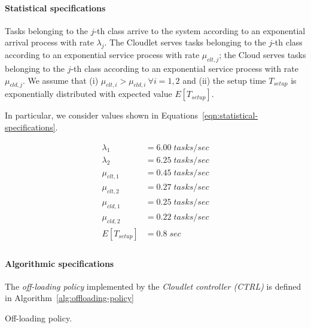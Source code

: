 \paragraph{Statistical specifications}
Tasks belonging to the $j$-th class arrive to the system according to an exponential arrival process with rate $ \lambda_{j}$.
The Cloudlet serves tasks belonging to the $j$-th class according to an exponential service process with rate $\mu_{clt,j}$; the Cloud serves tasks belonging to the $j$-th class according to an exponential service process with rate $\mu_{cld,j}$.
We assume that 
(i) $\mu_{clt,i}>\mu_{cld,i}\ \forall i=1,2$ and
(ii) the setup time $T_{setup}$ is exponentially distributed with expected value $E[T_{setup}]$.

In particular, we consider values shown in Equations~\ref{eqn:statistical-specifications}.

\begin{equation} 
\begin{split}
\lambda_{1}  &=6.00\;tasks/sec \\
\lambda_{2}  &=6.25\;tasks/sec \\
\mu_{clt,1}  &=0.45\;tasks/sec \\
\mu_{clt,2}  &=0.27\;tasks/sec \\
\mu_{cld,1}  &=0.25\;tasks/sec \\
\mu_{cld,2}  &=0.22\;tasks/sec \\
E[T_{setup}] &=0.8\;sec \\
\end{split}
\label{eqn:statistical-specifications}
\end{equation}

\paragraph{Algorithmic specifications}
The \textit{off-loading policy} implemented by the \textit{Cloudlet controller (CTRL)} is defined in Algorithm~\ref{alg:offloading-policy}

\begin{algorithm}
	\SetAlgoLined
	\caption{Off-loading policy.}
	\label{alg:offloading-policy}
\end{algorithm}

